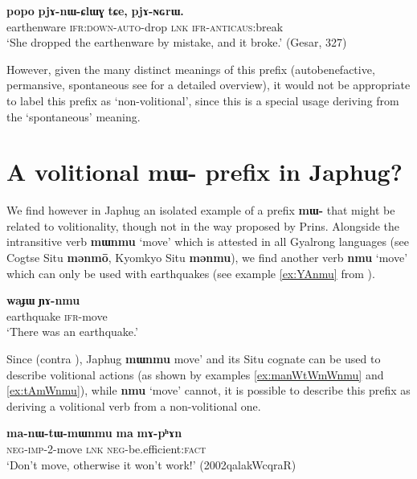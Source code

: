 \documentclass[oneside,a4paper,11pt]{article}
\newcommand{\ipa}[1]{\textbf{{\phon\mbox{#1}}}} %
\begin{document}
\begin{exe}
\ex \label{ex:pjAnWClWG}
\gll \ipa{popo} 	\ipa{pjɤ-nɯ-ɕlɯɣ} 	\ipa{tɕe,} 	\ipa{pjɤ-ɴɢrɯ.}  \\
earthenware \textsc{ifr:down-auto}-drop \textsc{lnk} \textsc{ifr-anticaus}:break \\
\glt `She dropped the earthenware by mistake, and it broke.' (Gesar, 327)
\end{exe}

 However, given the many distinct meanings of this prefix (autobenefactive,  permansive, spontaneous see \citet{jacques16japhug} for a detailed overview), it would not be appropriate to label this prefix as `non-volitional', since this is a special usage deriving from the `spontaneous' meaning.

\section{A volitional \ipa{mɯ-} prefix in Japhug?}
We find however in Japhug an isolated example of a prefix \ipa{mɯ-} that might be related to volitionality, though not in the way proposed by Prins. Alongside the intransitive verb \ipa{mɯnmu} `move' which is attested in all Gyalrong languages (see Cogtse Situ \ipa{mənmō}, Kyomkyo Situ \ipa{mənmu}), we find another verb \ipa{nmu} `move' which can only be used with earthquakes (see example \ref{ex:YAnmu} from \citealt{jacques16japhug}).

\begin{exe}
\ex \label{ex:YAnmu}
\gll
\ipa{waɟɯ} \ipa{ɲɤ-nmu} \\
earthquake \textsc{ifr}-move \\
\glt `There was an earthquake.'
\end{exe}

Since (contra \citealt[505]{prins16kyomkyo}), Japhug \ipa{mɯnmu}  move' and its Situ cognate can be used to describe volitional actions (as shown by examples  \ref{ex:manWtWmWnmu} and \ref{ex:tAmWnmu}), while \ipa{nmu} `move' cannot, it is possible to describe this prefix as deriving a volitional verb from a non-volitional one. 

\begin{exe}
\ex \label{ex:manWtWmWnmu}
\gll  \ipa{ma-nɯ-tɯ-mɯnmu} \ipa{ma} \ipa{mɤ-pʰɤn} \\
\textsc{neg-imp}-2-move \textsc{lnk} \textsc{neg}-be.efficient:\textsc{fact} \\
\glt `Don't move, otherwise it won't work!' (2002qalakWcqraR)
\end{exe}
\end{document}
